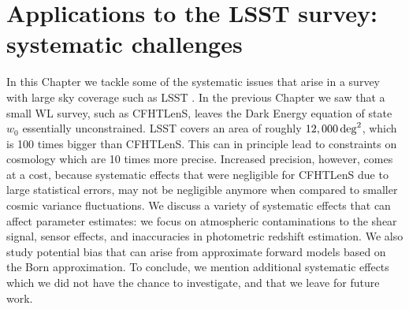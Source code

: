 
\chapter{Applications to the LSST survey: systematic challenges}
 \thispagestyle{plain}
\setlength{\parindent}{10mm}
\label{chp:7}

In this Chapter we tackle some of the systematic issues that arise in a survey with large sky coverage such as LSST \citep{LSST}. In the previous Chapter we saw that a small WL survey, such as CFHTLenS, leaves the Dark Energy equation of state $w_0$ essentially unconstrained. LSST covers an area of roughly $12,000\,{\rm deg}^2$, which is 100 times bigger than CFHTLenS. This can in principle lead to constraints on cosmology which are 10 times more precise. Increased precision, however, comes at a cost, because systematic effects that were negligible for CFHTLenS due to large statistical errors, may not be negligible anymore when compared to smaller cosmic variance fluctuations. We discuss a variety of systematic effects that can affect parameter estimates: we focus on atmospheric contaminations to the shear signal, sensor effects, and inaccuracies in photometric redshift estimation. We also study potential bias that can arise from approximate forward models based on the Born approximation. To conclude, we mention additional systematic effects which we did not have the chance to investigate, and that we leave for future work.    

